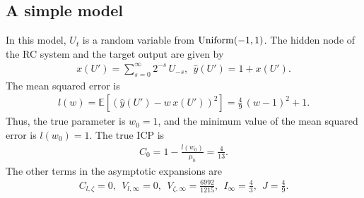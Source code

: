 \documentclass{article}
\begin{document}
 \subsection{A simple model}
\begin{comment}
・小さいが厳密に IPC や漸近形の各項を計算できる系で試す。
・多分ほぼ一致する。
\end{comment}
In this model, $U_t$ is a random variable from ${\rm Uniform}(-1, 1)$. 
The hidden node of the RC system and the target output are given by 
\begin{align}
 x(U') = \sum_{s=0}^\infty 2^{-s} \, U_{-s}, \ \
 \hat{y}(U') = 1 + x(U').
\end{align}
The mean squared error is 
\begin{align}
 l(w) = \mathbb{E}[( \hat{y}(U') - w \, x(U'))^2] = \frac{4}{9} \, (w-1)^2 + 1 . 
\end{align}
Thus, the true parameter is $w_0 = 1$, and the minimum value of the mean squared error is $l(w_0) = 1$. 
The true ICP is 
\begin{align}
 C_0 = 1 - \frac{l(w_0)}{\mu_0} = \frac{4}{13}. 
\end{align}
The other terms in the asymptotic expansions are 
\begin{align}
C_{l, \zeta} = 0, \ \ V_{l, \infty} = 0, \ \ V_{\zeta, \infty} = \frac{6992}{1215}, \ \
I_\infty = \frac{4}{3}, \ \ J = \frac{4}{9}. 
\end{align}
\end{document}
